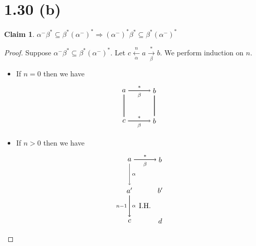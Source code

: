 \documentclass[autodetect-enginem]{article}
\theoremstyle{plain}
\theoremstyle{definition}
\newtheorem*{claim*}{Claim}
\begin{document}
\section*{1.30 (b)}

\begin{claim*}
    $\alpha^-\beta^* \subseteq \beta^*(\alpha^-)^* \Rightarrow (\alpha^-)^*\beta^* \subseteq \beta^*(\alpha^-)^*$
\end{claim*}

\begin{proof}
    Suppose $\alpha^-\beta^* \subseteq \beta^*(\alpha^-)^*$.
    Let $c \xleftarrow[\alpha]{n} a \xrightarrow[\beta]{*} b$.
    We perform induction on $n$.
    \begin{itemize}
        \item If $n = 0$ then we have
            \[
            \begin{tikzpicture}[auto]
                \node (a) at (0,0) {$a$}; \node (b) at (1.5,0) {$b$};
                \node (c) at (0,-1.5) {$c$}; \node (b') at (1.5,-1.5) {$b$};
                \draw[->] (a) to node[above]{$\scriptstyle *$} (b);
                \draw[] (a) to node[below]{$\scriptstyle \beta$} (b);

                \draw[double] (a) to (c);

                \draw[double] (b) to (b');

                \draw[->] (c) to node[above]{$\scriptstyle *$} (b');
                \draw[] (c) to node[below]{$\scriptstyle \beta$} (b');

            \end{tikzpicture}
        \]
        \item If $n > 0$ then we have
            \[
                \begin{tikzpicture}[auto]
                \node (a) at (0,0) {$a$}; \node (b) at (1.5, 0) {$b$};
                \node (a') at (0, -1.5) {$a'$}; \node (b') at (1.5, -1.5) {$b'$};
                \node (c) at (0, -3) {$c$}; \node (d) at (1.5,-3) {$d$};
                \node (IH) at (0.75, -(1.5 + 0.75) {I.H.};

                \draw[->] (a) to node[above]{$\scriptstyle *$} (b);
                \draw[->] (a) to node[below]{$\scriptstyle \beta$} (b);
                
                \draw[->] (a) to node{$\scriptstyle \alpha$} (a');
                
                \draw[->] (a') to node[swap]{$\scriptstyle n-1$} (c);
                \draw[->] (a') to node{$\scriptstyle \alpha$} (c);


\end{tikzpicture}\]
\end{itemize}
\end{proof}
\end{document}
